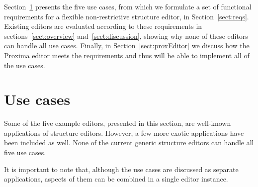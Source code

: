 Section~\ref{sect:usecases} presents the five use cases, from which we formulate a set of functional requirements for a flexible non-restrictive structure editor, in Section~\ref{sect:reqs}. Existing editors are evaluated according to these requirements in sections~\ref{sect:overview} and~\ref{sect:discussion}, showing why none of these editors can handle all use cases. Finally, in Section~\ref{sect:proxEditor} we discuss how the Proxima editor meets the requirements and thus will be able to implement all of the use cases.

\section{Use cases}
\label{sect:usecases}

Some of the five example editors, presented in this section, are well-known applications of structure editors. However, a few more exotic applications have been included as well. None of the current generic structure editors can handle all five use cases.

It is important to note that, although the use cases are discussed as separate applications, aspects of them can be combined in a single editor instance.

\newcommand{\screenshot}[2]{%
%
\noindent 
\begin{center}
\begin{picture}(250,180)(0,0)
\begin{tiny}
\put(0,30){ \framebox(250,150){#1}}
\end{tiny}
\put(0,0) { \makebox(250,30){#2}}
\end{picture}
\end{center}
}

\newcommand{\smallScreenshot}[2]{%
%
\noindent
\begin{center}
\begin{picture}(170,130)(0,0)
\begin{tiny}
\put(0,30){ \framebox(170,100){#1}}
\end{tiny}
\put(0,0) { \makebox(170,30){#2}}
\end{picture}
\end{center}
}

\newcommand{\editScreenshot}[4]{%
%
\noindent
\begin{center}
\begin{picture}(350,130)(0,0)
\begin{tiny}
\put(0,30){ \framebox(170,100){#1}}
\put(180,30){ \framebox(170,100){#2}}
\end{tiny}
\put(170,13){ $\Rightarrow$}
\put(0,0) { \makebox(170,30){#3}}
\put(180,0) { \makebox(170,30){#4}}
\end{picture}
\end{center}
}


